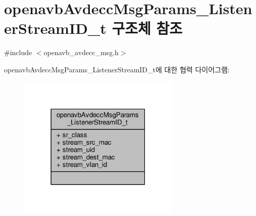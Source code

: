 \hypertarget{structopenavb_avdecc_msg_params___listener_stream_i_d__t}{}\section{openavb\+Avdecc\+Msg\+Params\+\_\+\+Listener\+Stream\+I\+D\+\_\+t 구조체 참조}
\label{structopenavb_avdecc_msg_params___listener_stream_i_d__t}


{\ttfamily \#include $<$openavb\+\_\+avdecc\+\_\+msg.\+h$>$}



openavb\+Avdecc\+Msg\+Params\+\_\+\+Listener\+Stream\+I\+D\+\_\+t에 대한 협력 다이어그램\+:
\nopagebreak
\begin{figure}[H]
\begin{center}
\leavevmode
\includegraphics[width=219pt]{structopenavb_avdecc_msg_params___listener_stream_i_d__t__coll__graph}
\end{center}
\end{figure}
